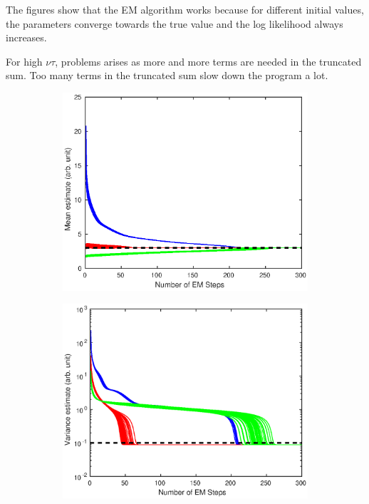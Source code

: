 \documentclass[12pt]{report}
\begin{document}
The figures show that the EM algorithm works because for different initial values, the parameters converge towards the true value and the log likelihood always increases.

For high $\nu\tau$, problems arises as more and more terms are needed in the truncated sum. Too many terms in the truncated sum slow down the program a lot.

\begin{figure}
	\centering
	\begin{subfigure}{0.45\textwidth}
		\includegraphics[width=\textwidth]{figures/hierarchicalModel/EM_initial_mean.eps}
	\end{subfigure}
	\begin{subfigure}{0.45\textwidth}
		\includegraphics[width=\textwidth]{figures/hierarchicalModel/EM_initial_var.eps}

\end{subfigure}
\end{figure}
\end{document}
